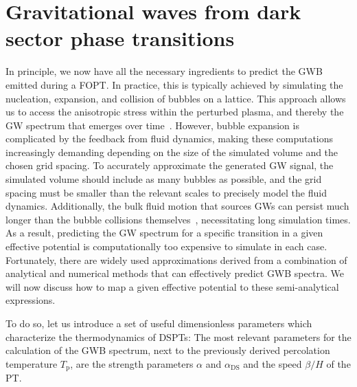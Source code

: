 \section{Gravitational waves from dark sector phase transitions} \label{sec:gwfopt}

In principle, we now have all the necessary ingredients to predict the \ac{GWB} emitted during a \ac{FOPT}. In practice, this is typically achieved by simulating the nucleation, expansion, and collision of bubbles on a lattice. This approach allows us to access the anisotropic stress within the perturbed plasma, and thereby the \ac{GW} spectrum that emerges over time~\cite{Hindmarsh:2020hop}. However, bubble expansion is complicated by the feedback from fluid dynamics, making these computations increasingly demanding depending on the size of the simulated volume and the chosen grid spacing.  To accurately approximate the generated \ac{GW} signal, the simulated volume should include as many bubbles as possible, and the grid spacing must be smaller than the relevant scales to precisely model the fluid dynamics. Additionally, the bulk fluid motion that sources \acp{GW} can persist much longer than the bubble collisions themselves~\cite{Caprini:2019egz}, necessitating long simulation times. As a result, predicting the \ac{GW} spectrum for a specific transition in a given effective potential is computationally too expensive to simulate in each case. Fortunately, there are widely used approximations derived from a combination of analytical and numerical methods that can effectively predict \ac{GWB} spectra. We will now discuss how to map a given effective potential to these semi-analytical expressions.

To do so, let us introduce a set of useful dimensionless parameters which characterize the thermodynamics of \acp{DSPT}: The most relevant parameters for the calculation of the \ac{GWB} spectrum, next to the previously derived percolation temperature $T_\text{p}$, are the strength parameters $\alpha$ and $\alpha_\text{DS}$ and the speed $\beta/H$ of the \ac{PT}.

